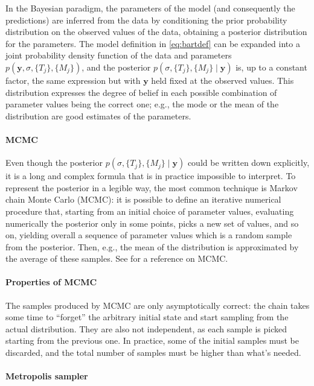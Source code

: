 \documentclass{article}
\begin{document}
    In the Bayesian paradigm, the parameters of the model (and consequently the predictions) are inferred from the data by conditioning the prior probability distribution on the observed values of the data, obtaining a posterior distribution for the parameters. The model definition in \autoref{eq:bartdef} can be expanded into a joint probability density function of the data and parameters $p(\mathbf y, \sigma, \{T_j\}, \{M_j\})$, and the posterior $p(\sigma, \{T_j\}, \{M_j\}\mid \mathbf y)$ is, up to a constant factor, the same expression but with $\mathbf y$ held fixed at the observed values. This distribution expresses the degree of belief in each possible combination of parameter values being the correct one; e.g., the mode or the mean of the distribution are good estimates of the parameters.

    \paragraph{MCMC}

    Even though the posterior $p(\sigma, \{T_j\}, \{M_j\}\mid \mathbf y)$ could be written down explicitly, it is a long and complex formula that is in practice impossible to interpret. To represent the posterior in a legible way, the most common technique is Markov chain Monte Carlo (MCMC): it is possible to define an iterative numerical procedure that, starting from an initial choice of parameter values, evaluating numerically the posterior only in some points, picks a new set of values, and so on, yielding overall a sequence of parameter values which is a random sample from the posterior. Then, e.g., the mean of the distribution is approximated by the average of these samples. See \textcite{brooks2011} for a reference on MCMC.

    \paragraph{Properties of MCMC}

    The samples produced by MCMC are only asymptotically correct: the chain takes some time to ``forget'' the arbitrary initial state and start sampling from the actual distribution. They are also not independent, as each sample is picked starting from the previous one. In practice, some of the initial samples must be discarded, and the total number of samples must be higher than what's needed.

    \paragraph{Metropolis sampler}
\end{document}
